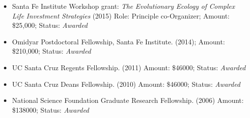 \documentclass[margin,line,12pt]{res}
\begin{document}
\begin{resume}
\begin{itemize}
\item Santa Fe Institute Workshop grant: \emph{The Evolutionary Ecology of Complex Life Investment Strategies} (2015) Role: Principle co-Organizer; Amount: \$25,000; Status: \emph{Awarded}

\item Omidyar Postdoctoral Fellowship, Santa Fe Institute. (2014); Amount: \$210,000; Status: \emph{Awarded}

\item UC Santa Cruz Regents Fellowship. (2011) Amount: \$46000; Status: \emph{Awarded}

\item UC Santa Cruz Deans Fellowship. (2010) Amount: \$46000; Status: \emph{Awarded}

\item National Science Foundation Graduate Research Fellowship. (2006) Amount: \$138000; Status: \emph{Awarded}









\end{itemize}
\end{resume}
\end{document}
